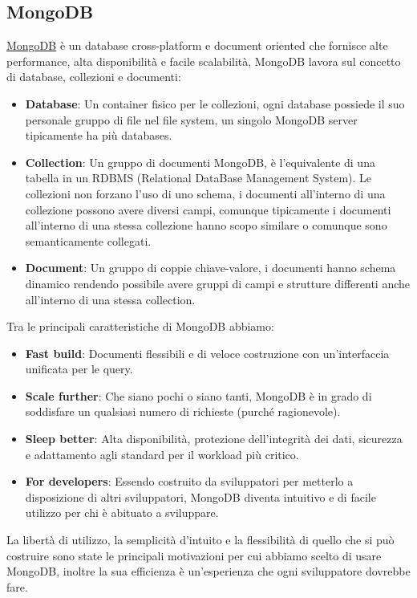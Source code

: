 \documentclass{article}
\newcommand{\mongodb}{\href{https://www.mongodb.com/it-it}{MongoDB} }
\begin{document}
\subsection{MongoDB}\label{sub:mongo}
\mongodb è un database cross-platform e document oriented che fornisce alte performance, alta disponibilità e facile scalabilità, MongoDB lavora sul concetto di database, collezioni e documenti:
\begin{itemize}
	\item \textbf{Database}: Un container fisico per le collezioni, ogni database possiede il suo personale gruppo di file nel file system, un singolo MongoDB server tipicamente ha più databases.
	\item \textbf{Collection}: Un gruppo di documenti MongoDB, è l'equivalente di una tabella in un RDBMS (Relational DataBase Management System). Le collezioni non forzano l'uso di uno schema, i documenti all'interno di una collezione possono avere diversi campi, comunque tipicamente i documenti all'interno di una stessa collezione hanno scopo similare o comunque sono semanticamente collegati.
	\item \textbf{Document}: Un gruppo di coppie chiave-valore, i documenti hanno schema dinamico rendendo possibile avere gruppi di campi e strutture differenti anche all'interno di una stessa collection.
\end{itemize}
Tra le principali caratteristiche di MongoDB abbiamo:
\begin{itemize}
	\item \textbf{Fast build}: Documenti flessibili e di veloce costruzione con un'interfaccia unificata per le query.
	\item \textbf{Scale further}: Che siano pochi o siano tanti, MongoDB è in grado di soddisfare un qualsiasi numero di richieste (purché ragionevole).
	\item \textbf{Sleep better}: Alta disponibilità, protezione dell'integrità dei dati, sicurezza e adattamento agli standard per il workload più critico.
	\item \textbf{For developers}: Essendo costruito da sviluppatori per metterlo a disposizione di altri sviluppatori, MongoDB diventa intuitivo e di facile utilizzo per chi è abituato a sviluppare.
\end{itemize}
La libertà di utilizzo, la semplicità d'intuito e la flessibilità di quello che si può costruire sono state le principali motivazioni per cui abbiamo scelto di usare MongoDB, inoltre la sua efficienza è un'esperienza che ogni sviluppatore dovrebbe fare.
\end{document}
